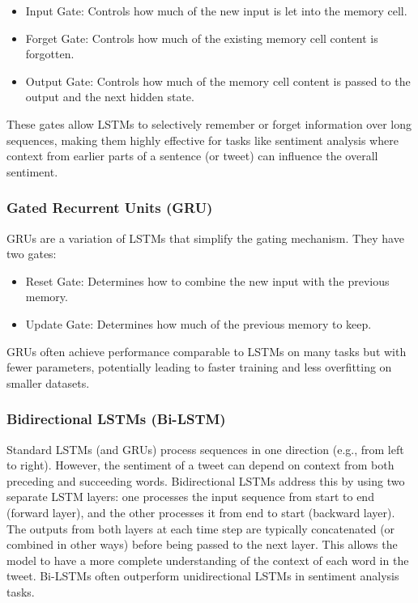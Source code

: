 \begin{itemize}
    \item Input Gate: Controls how much of the new input is let into the memory cell.
    \item Forget Gate: Controls how much of the existing memory cell content is forgotten.
    \item Output Gate: Controls how much of the memory cell content is passed to the output and the next hidden state.
\end{itemize}

These gates allow LSTMs to selectively remember or forget information over long sequences, making them highly effective for tasks like sentiment analysis where context from earlier parts of a sentence (or tweet) can influence the overall sentiment.

\subsubsection{Gated Recurrent Units (GRU)}
GRUs are a variation of LSTMs that simplify the gating mechanism. They have two gates:

\begin{itemize}
    \item Reset Gate: Determines how to combine the new input with the previous memory.
    \item Update Gate: Determines how much of the previous memory to keep.
\end{itemize}

GRUs often achieve performance comparable to LSTMs on many tasks but with fewer parameters, potentially leading to faster training and less overfitting on smaller datasets.

\subsubsection{Bidirectional LSTMs (Bi-LSTM)}
Standard LSTMs (and GRUs) process sequences in one direction (e.g., from left to right). However, the sentiment of a tweet can depend on context from both preceding and succeeding words. Bidirectional LSTMs address this by using two separate LSTM layers: one processes the input sequence from start to end (forward layer), and the other processes it from end to start (backward layer). The outputs from both layers at each time step are typically concatenated (or combined in other ways) before being passed to the next layer. This allows the model to have a more complete understanding of the context of each word in the tweet. Bi-LSTMs often outperform unidirectional LSTMs in sentiment analysis tasks.

